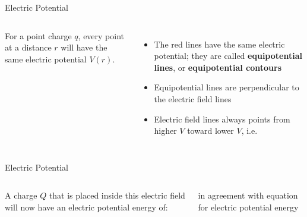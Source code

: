 \documentclass[12pt,aspectratio=169]{beamer}
\begin{document}
\begin{frame}{Electric Potential}
  \begin{columns}
    \centering
 
    For a point charge $q$, every point at a distance $r$ will have the same
    electric potential $V(r)$.
    \begin{itemize}
    \item The red lines have the same electric potential; they are called
      \textbf{equipotential lines}, or \textbf{equipotential contours}
    \item Equipotential lines are perpendicular to the electric field lines
    \item Electric field lines always points from higher $V$ toward lower $V$,
      i.e.

    \end{itemize}
  \end{columns}
\end{frame}



\begin{frame}{Electric Potential}
  \begin{columns}
    \centering
    
    A charge $Q$ that is placed inside this electric field will now have an
    electric potential energy of:


    in agreement with equation for electric potential energy
  \end{columns}
\end{frame}
\end{document}
